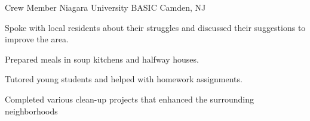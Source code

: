 

\begin{cventries}

  \cventry
    {Crew Member} %
    {Niagara University BASIC} %
    {Camden, NJ} %
    {} %
    {
      \begin{cvitems} %
\item {Spoke with local residents about their struggles and discussed their suggestions to improve the area.}
\item {Prepared meals in soup kitchens and halfway houses.}
\item {Tutored young students and helped with homework assignments.}
\item {Completed various clean-up projects that enhanced the surrounding neighborhoods}
      \end{cvitems}
    }


\end{cventries}
